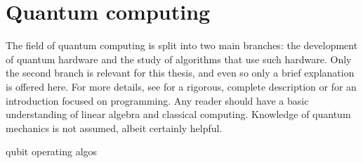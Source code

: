 \chapter{Quantum computing}
\label{chap:qc}
The field of quantum computing is split into two main branches: the development of quantum hardware and the study of algorithms that use such hardware.
Only the second branch is relevant for this thesis, and even so only a brief explanation is offered here.
For more details, see \autocite{nielsen2012} for a rigorous, complete description or \autocite{qiskit_textbook} for an introduction focused on programming.
Any reader should have a basic understanding of linear algebra and classical computing.
Knowledge of quantum mechanics is not assumed, albeit certainly helpful.

{qubit}
{operating}
{algos}





